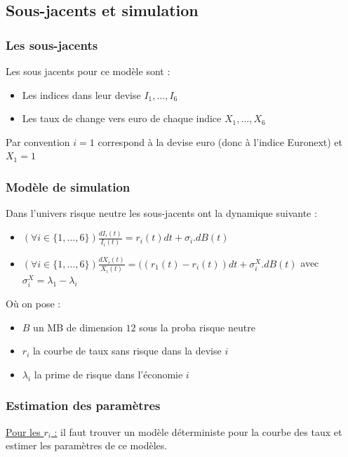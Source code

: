 \documentclass[a4paper,12pt]{article}
\begin{document}
\subsection{Sous-jacents et simulation}
\subsubsection{Les sous-jacents}
Les sous jacents pour ce modèle sont : 
\begin{itemize}[label=$\star$]
\item Les indices dans leur devise $I_1,\ldots,I_6$
\item Les taux de change vers euro de chaque indice $X_1,\ldots,X_6$
\end{itemize}
Par convention $i=1$ correspond à la devise euro (donc à l'indice Euronext) et $X_1=1$
\subsubsection{Modèle de simulation}
Dans l'univers risque neutre les sous-jacents ont la dynamique suivante : 
\begin{itemize}[label=$\star$]
\item $\left(\forall i\in\{1,\ldots,6\}\right) \frac{dI_i(t)}{I_i(t)}=r_i(t)dt + \sigma_i.dB(t)$
\item $\left(\forall i\in\{1,\ldots,6\}\right) \frac{dX_i(t)}{X_i(t)}=((r_1(t)-r_i(t))dt+\sigma^X_i.dB(t)$ avec $\sigma^X_i= \lambda_1-\lambda_i$
\end{itemize}
Où on pose : 
\begin{itemize}[label=$\bullet$]
\item $B$ un MB de dimension $12$ sous la proba risque neutre
\item $r_i$ la courbe de taux sans risque dans la devise $i$
\item $\lambda_i$ la prime de risque dans l'économie $i$
\end{itemize}
\subsubsection{Estimation des paramètres}
\underline{Pour les $r_i$ :} il faut trouver un modèle déterministe pour la courbe des taux et estimer les paramètres de ce modèles. \\
\end{document}
